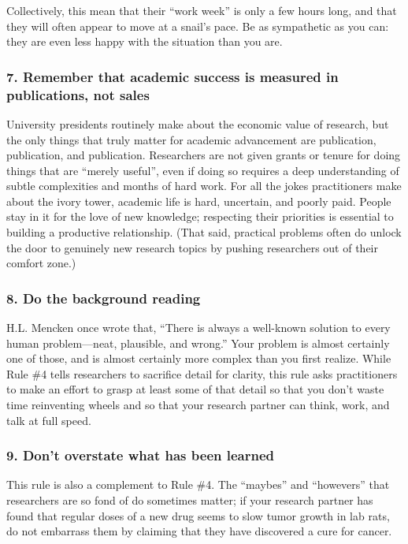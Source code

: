 \documentclass[10pt,letterpaper]{article}
\begin{document}
Collectively, this mean that their ``work week'' is only a few hours long, and
that they will often appear to move at a snail's pace. Be as sympathetic as you
can: they are even less happy with the situation than you are.

\subsubsection*{7. Remember that academic success is measured in publications, not sales}

University presidents routinely make about the economic value of research, but
the only things that truly matter for academic advancement are publication,
publication, and publication. Researchers are not given grants or tenure for
doing things that are ``merely useful'', even if doing so requires a deep
understanding of subtle complexities and months of hard work. For all the jokes
practitioners make about the ivory tower, academic life is hard, uncertain, and
poorly paid. People stay in it for the love of new knowledge; respecting their
priorities is essential to building a productive relationship. (That said,
practical problems often do unlock the door to genuinely new research topics by
pushing researchers out of their comfort zone.)

\subsubsection*{8. Do the background reading}

H.L. Mencken once wrote that, ``There is always a well-known solution to every
human problem—neat, plausible, and wrong.'' Your problem is almost certainly
one of those, and is almost certainly more complex than you first realize. While
Rule \#4 tells researchers to sacrifice detail for clarity, this rule asks
practitioners to make an effort to grasp at least some of that detail so that
you don't waste time reinventing wheels and so that your research partner can
think, work, and talk at full speed.

\subsubsection*{9. Don't overstate what has been learned}

This rule is also a complement to Rule \#4. The ``maybes'' and ``howevers'' that
researchers are so fond of do sometimes matter; if your research partner has
found that regular doses of a new drug seems to slow tumor growth in lab rats,
do not embarrass them by claiming that they have discovered a cure for cancer.
\end{document}
